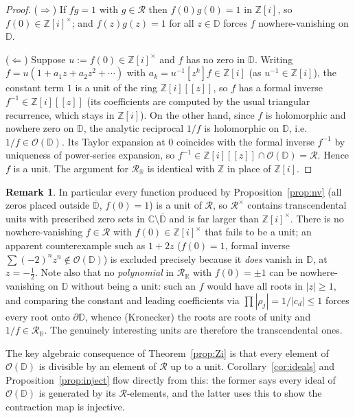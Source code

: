 \documentclass{amsart}
\theoremstyle{definition}
\newtheorem{remark}[theorem]{Remark}
\newcommand{\D}{\mathbb{D}}
\newcommand{\Z}{\mathbb{Z}}
\newcommand{\Zi}{\mathbb{Z}[i]}
\newcommand{\C}{\mathbb{C}}
\newcommand{\abs}[1]{\left|#1\right|}
\newcommand{\OD}{\mathcal{O}(\D)}
\newcommand{\mR}{\mathcal{R}}
\newcommand{\mRR}{\mathcal{R}_{\mathbb{R}}}
\begin{document}
\begin{proof}
($\Rightarrow$) If $fg = 1$ with $g \in \mR$ then $f(0)g(0) = 1$ in
$\Zi$, so $f(0) \in \Zi^\times$; and $f(z)g(z) = 1$ for all $z \in \D$
forces $f$ nowhere-vanishing on $\D$.

($\Leftarrow$) Suppose $u := f(0) \in \Zi^\times$ and $f$ has no zero in
$\D$.  Writing $f = u(1 + a_1 z + a_2 z^2 + \cdots)$ with $a_k =
u^{-1}[z^k]f \in \Zi$ (as $u^{-1} \in \Zi$), the constant term $1$ is a
unit of the ring $\Zi[[z]]$, so $f$ has a formal inverse $f^{-1} \in
\Zi[[z]]$ (its coefficients are computed by the usual triangular
recurrence, which stays in $\Zi$).  On the other hand, since $f$ is
holomorphic and nowhere zero on $\D$, the analytic reciprocal $1/f$ is
holomorphic on $\D$, i.e.\ $1/f \in \OD$.  Its Taylor expansion at $0$
coincides with the formal inverse $f^{-1}$ by uniqueness of power-series
expansion, so $f^{-1} \in \Zi[[z]] \cap \OD = \mR$.  Hence $f$ is a unit.
The argument for $\mRR$ is identical with $\Z$ in place of $\Zi$.
\end{proof}

\begin{remark}
\label{rem:nv-units}
In particular every function produced by Proposition~\ref{prop:nv} (all
zeros placed outside $\overline{\D}$, $f(0) = 1$) is a unit of $\mR$, so
$\mR^\times$ contains transcendental units with prescribed zero sets in
$\C \setminus \overline{\D}$ and is far larger than $\Zi^\times$.
There is no nowhere-vanishing $f \in \mR$ with $f(0) \in \Zi^\times$
that fails to be a unit; an apparent counterexample such as $1 + 2z$
($f(0) = 1$, formal inverse $\sum(-2)^n z^n \notin \OD$) is excluded
precisely because it \emph{does} vanish in $\D$, at $z = -\tfrac12$.
Note also that no \emph{polynomial} in $\mRR$ with $f(0) = \pm 1$ can be
nowhere-vanishing on $\D$ without being a unit: such an $f$ would have
all roots in $\abs{z} \geq 1$, and comparing the constant and leading
coefficients via $\prod \abs{\rho_j} = 1/\abs{c_d} \leq 1$ forces every
root onto $\partial\D$, whence (Kronecker) the roots are roots of unity
and $1/f \in \mRR$.  The genuinely interesting units are therefore the
transcendental ones.
\end{remark}

The key algebraic consequence of Theorem~\ref{prop:Zi} is that every
element of $\OD$ is divisible by an element of $\mR$ up to a unit.
Corollary~\ref{cor:ideals} and Proposition~\ref{prop:inject} flow directly
from this: the former says every ideal of $\OD$ is generated by its
$\mR$-elements, and the latter uses this to show the contraction map is
injective.
\end{document}
